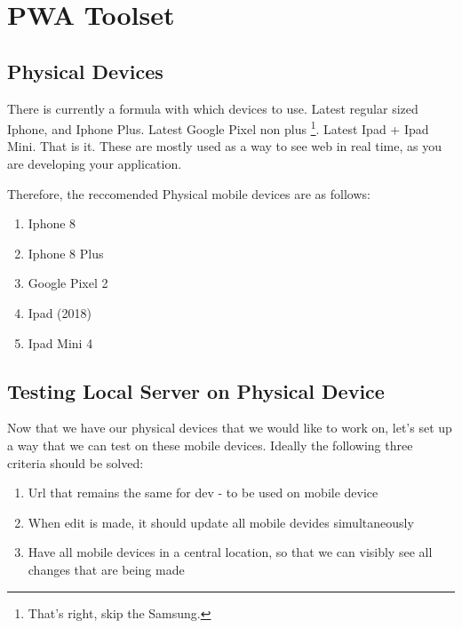 \maketitle{}
\section{ PWA Toolset }

\subsection{ Physical Devices }
There is currently a formula with which devices to use. Latest regular sized
Iphone, and Iphone Plus. Latest Google Pixel non plus
\footnote{That's right, skip the Samsung.}. Latest Ipad + Ipad Mini. That
is it. These are mostly used as a way to see web in real time, as you are
developing your application.

Therefore, the reccomended Physical mobile devices are as follows:
\begin{enumerate}
  \item Iphone 8
  \item Iphone 8 Plus
  \item Google Pixel 2
  \item Ipad (2018)
  \item Ipad Mini 4
\end{enumerate}

\subsection{ Testing Local Server on Physical Device }

Now that we have our physical devices that we would like to work on, let's set
up a way that we can test on these mobile devices. Ideally the following three
criteria should be solved:
\begin{enumerate}
  \item Url that remains the same for dev - to be used on mobile device
  \item When edit is made, it should update all mobile devides simultaneously
  \item Have all mobile devices in a central location, so that we can visibly
  see all changes that are being made
\end{enumerate}
